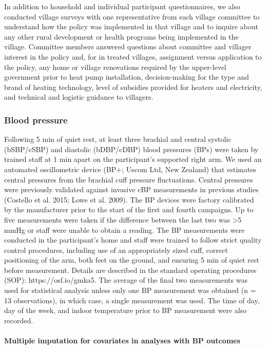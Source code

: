 \documentclass[
  letterpaper,
  DIV=11,
  numbers=noendperiod]{scrartcl}
\let\oldparagraph\paragraph
\renewcommand{\paragraph}[1]{\oldparagraph{#1}\mbox{}}
\begin{document}
In addition to household and individual participant questionnaires, we
also conducted village surveys with one representative from each village
committee to understand how the policy was implemented in that village
and to inquire about any other rural development or health programs
being implemented in the village. Committee members answered questions
about committee and villager interest in the policy and, for in treated
villages, assignment versus application to the policy, any home or
village renovations required by the upper-level government prior to heat
pump installation, decision-making for the type and brand of heating
technology, level of subsidies provided for heaters and electricity, and
technical and logistic guidance to villagers.

\hypertarget{blood-pressure}{%
\subsubsection{Blood pressure}\label{blood-pressure}}

Following 5 min of quiet rest, at least three brachial and central
systolic (bSBP/cSBP) and diastolic (bDBP/cDBP) blood pressures (BPs)
were taken by trained staff at 1 min apart on the participant's
supported right arm. We used an automated oscillometric device (BP+;
Uscom Ltd, New Zealand) that estimates central pressures from the
brachial cuff pressure fluctuations. Central pressures were previously
validated against invasive cBP measurements in previous studies
(Costello et al. 2015; Lowe et al. 2009). The BP devices were factory
calibrated by the manufacturer prior to the start of the first and
fourth campaigns. Up to five measurements were taken if the difference
between the last two was \textgreater5 mmHg or staff were unable to
obtain a reading. The BP measurements were conducted in the
participant's home and staff were trained to follow strict quality
control procedures, including use of an appropriately sized cuff,
correct positioning of the arm, both feet on the ground, and ensuring 5
min of quiet rest before measurement. Details are described in the
standard operating procedures (SOP): https://osf.io/gmka5. The average
of the final two measurements was used for statistical analysis unless
only one BP measurement was obtained (n = 13 observations), in which
case, a single measurement was used. The time of day, day of the week,
and indoor temperature prior to BP measurement were also recorded.

\hypertarget{multiple-imputation-for-covariates-in-analyses-with-bp-outcomes}{%
\paragraph{Multiple imputation for covariates in analyses with BP
outcomes}\label{multiple-imputation-for-covariates-in-analyses-with-bp-outcomes}}
\end{document}
